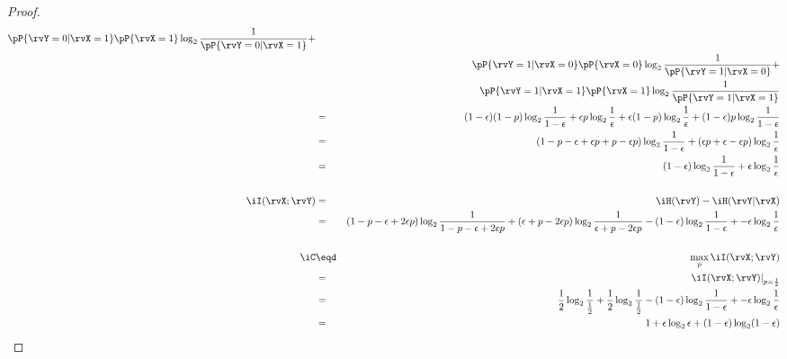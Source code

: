 \begin{proof}
\begin{eqnarray*}
           \pP{\rvY=0|\rvX=1}\pP{\rvX=1} \log_2 \frac{1}{\pP{\rvY=0|\rvX=1}} + \\&&
           \pP{\rvY=1|\rvX=0}\pP{\rvX=0} \log_2 \frac{1}{\pP{\rvY=1|\rvX=0}} + \\&&
           \pP{\rvY=1|\rvX=1}\pP{\rvX=1} \log_2 \frac{1}{\pP{\rvY=1|\rvX=1}} 
  \\&=&    (1-\epsilon ) (1-p) \log_2 \frac{1}{1-\epsilon } +
           \epsilon      p     \log_2 \frac{1}{\epsilon   } +
           \epsilon      (1-p) \log_2 \frac{1}{\epsilon   } +
           (1-\epsilon ) p     \log_2 \frac{1}{1-\epsilon } 
  \\&=&    (1-p-\epsilon +\epsilon p+p-\epsilon p) \log_2 \frac{1}{1-\epsilon } +
           (\epsilon p+\epsilon -\epsilon p)   \log_2 \frac{1}{\epsilon   }
  \\&=&    (1-\epsilon ) \log_2 \frac{1}{1-\epsilon } +
           \epsilon      \log_2 \frac{1}{\epsilon   }
\\
\\
  \iI(\rvX;\rvY)
    &=& \iH(\rvY) - \iH(\rvY|\rvX)
  \\&=&    (1-p-\epsilon +2\epsilon p) \log_2 \frac{1}{1-p-\epsilon +2\epsilon p} + 
           (\epsilon +p-2\epsilon p)   \log_2 \frac{1}{\epsilon +p-2\epsilon p}
           - (1-\epsilon ) \log_2 \frac{1}{1-\epsilon } +
           - \epsilon      \log_2 \frac{1}{\epsilon   }
\\
\\
  \iC
    &\eqd& \max_p \iI(\rvX;\rvY)
  \\&=&    \left. \iI(\rvX;\rvY) \right|_{p=\frac{1}{2}}
  \\&=&    \frac{1}{2} \log_2 \frac{1}{\frac{1}{2}} + 
           \frac{1}{2} \log_2 \frac{1}{\frac{1}{2}}
           - (1-\epsilon ) \log_2 \frac{1}{1-\epsilon } +
           - \epsilon      \log_2 \frac{1}{\epsilon   }
  \\&=&    1  + \epsilon \log_2 \epsilon  + (1-\epsilon ) \log_2 (1-\epsilon )
\end{eqnarray*}
\end{proof}

\begin{remark}
\mbox{}\\
\end{remark}

